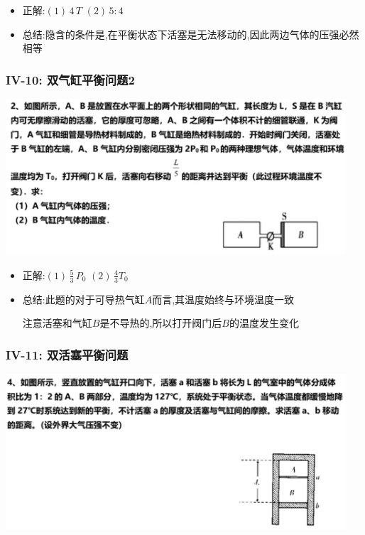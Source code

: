 \documentclass{article}
\begin{document}
\begin{itemize}
    \item 正解:\quad $(1) \, 4 \, T$  $(2) \, 5:4 $
    \item 总结:\quad 隐含的条件是,在平衡状态下活塞是无法移动的,因此两边气体的压强必然相等
\end{itemize}

\vspace{2em}

\subsubsection{IV-10: 双气缸平衡问题2}
\includegraphics[width = 0.95\textwidth,keepaspectratio]{./pictures/2.3-22.png}

\begin{itemize}
    \item 正解:\quad $(1) \, \frac{5}{3} \, P_{0}$  $(2) \, \frac{4}{3} T_{0} $
    \item 总结:\quad 此题的对于可导热气缸$A$而言,其温度始终与环境温度一致
    
    \hspace{3.2em} 注意活塞和气缸$B$是不导热的,所以打开阀门后$B$的温度发生变化
\end{itemize}

\vspace{2em}

\subsubsection{IV-11: 双活塞平衡问题}
\includegraphics[width = 0.95\textwidth,keepaspectratio]{./pictures/2.3-23.png}
\end{document}
